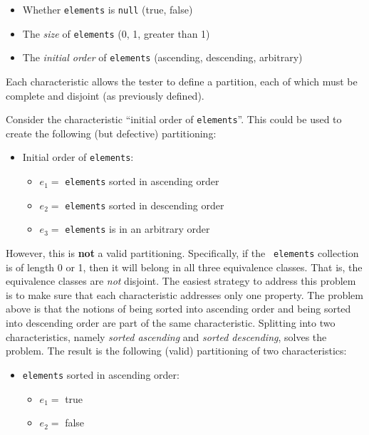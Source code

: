 \begin{itemize}
    \item Whether {\tt elements} is {\tt null} (true, false)
    \item The {\it size} of {\tt elements} (0, 1, greater than 1)
    \item The {\it initial order} of {\tt elements} (ascending, descending, arbitrary)   
\end{itemize}

Each characteristic allows the tester to define a partition, each of which must
be complete and disjoint (as previously defined). 

Consider the characteristic ``initial order of {\tt elements}''.
This could be used to create the following (but defective) partitioning: 

\begin{itemize}
    \item Initial order of {\tt elements}:
    \begin{itemize}
        \item $e_1 =$ {\tt elements} sorted in ascending order
        \item $e_2 =$ {\tt elements} sorted in descending order
        \item $e_3 =$ {\tt elements} is in an arbitrary order
    \end{itemize}
\end{itemize}

However, this is {\bf not} a valid partitioning. Specifically, if the {\tt
elements} collection is of length 0 or 1, then it will belong in all three
equivalence classes. That is, the equivalence classes are {\it not} disjoint.
The easiest strategy to address this problem is to make sure that each
characteristic addresses only one property. The problem above is that the
notions of being sorted into ascending order and being sorted into descending
order are part of the same characteristic. Splitting into two characteristics,
namely {\it sorted ascending} and {\it sorted descending}, solves the problem.
The result is the following (valid) partitioning of two characteristics:

\begin{itemize}
    \item {\tt elements} sorted in ascending order:
    \begin{itemize}
        \item $e_1 =$ true
        \item $e_2 =$ false
    \end{itemize}
\end{itemize}

